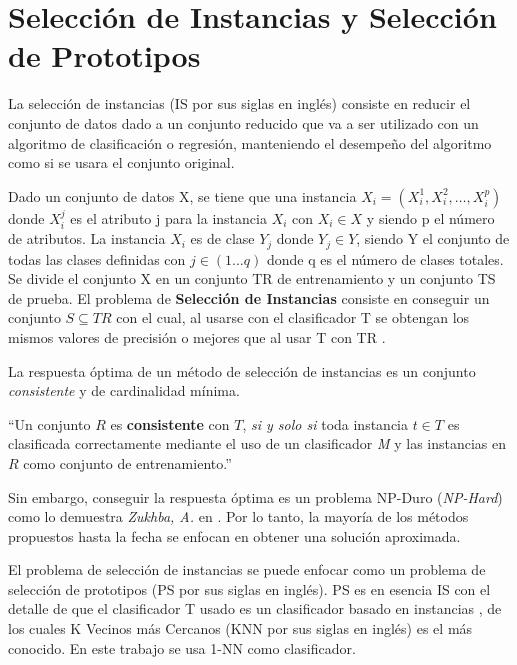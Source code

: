 \section{Selección de Instancias y Selección de Prototipos}

La selección de instancias (IS por sus siglas en inglés) consiste en reducir el conjunto de datos dado a un conjunto reducido que va a ser utilizado con un algoritmo de clasificación o regresión, manteniendo el desempeño del algoritmo como si se usara el conjunto original.\\

\begin{definicion}
Dado un conjunto de datos X, se tiene que una instancia $X_i = (X_i^1,X_i^2,\dots,X_i^p)$ donde $X_i^j$ es el atributo j para la instancia $X_i$ con $X_i\in X$ y siendo p el número de atributos. La instancia $X_i$ es de clase $Y_j$ donde $Y_j\in Y$, siendo Y el conjunto de todas las clases definidas con $j\in (1\dots q)$ donde q es el número de clases totales. Se divide el conjunto X en un conjunto TR de entrenamiento y un conjunto TS de prueba. El problema de \textbf{Selección de Instancias} consiste en conseguir un conjunto $S\subseteq TR$ con el cual, al usarse con el clasificador T se obtengan los mismos valores de precisión o mejores que al usar T con TR \cite{garcia2016data}.
\end{definicion}

La respuesta óptima de un método de selección de instancias es un conjunto \emph{consistente} y de cardinalidad mínima.\\

\begin{definicion}
``Un conjunto $R$ es \textbf{consistente} con $T$, \emph{si y solo si} toda instancia $t \in T$ es clasificada correctamente mediante el uso de un clasificador \emph{M} y las instancias en $R$ como conjunto de entrenamiento.'' \cite{flores2014metaheuristics}
\end{definicion}

Sin embargo, conseguir la respuesta óptima es un problema NP-Duro (\emph{NP-Hard}) como lo demuestra \emph{Zukhba, A.} en \cite{zukhba2010np}. Por lo tanto, la mayoría de los métodos propuestos hasta la fecha se enfocan en obtener una solución aproximada.

El problema de selección de instancias se puede enfocar como un problema de selección de prototipos (PS por sus siglas en inglés). PS es en esencia IS con el detalle de que el clasificador T usado es un clasificador basado en instancias \cite{garcia2016data}, de los cuales K Vecinos más Cercanos (KNN por sus siglas en inglés) es el más conocido. En este trabajo se usa 1-NN como clasificador.

